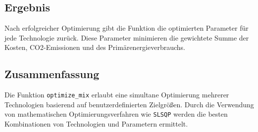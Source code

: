 \subsection{Ergebnis}
Nach erfolgreicher Optimierung gibt die Funktion die optimierten Parameter für jede Technologie zurück. Diese Parameter minimieren die gewichtete Summe der Kosten, CO2-Emissionen und des Primärenergieverbrauchs.

\subsection{Zusammenfassung}
Die Funktion \texttt{optimize\_mix} erlaubt eine simultane Optimierung mehrerer Technologien basierend auf benutzerdefinierten Zielgrößen. Durch die Verwendung von mathematischen Optimierungsverfahren wie \texttt{SLSQP} werden die besten Kombinationen von Technologien und Parametern ermittelt.
